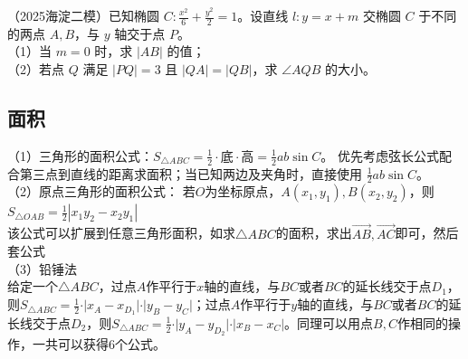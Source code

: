 \begin{example} 
（2025海淀二模）已知椭圆 $C:\frac{x^2}{6}+\frac{y^2}{2}=1$。设直线 $l:y=x+m$ 交椭圆 $C$ 于不同的两点 $A,B$，与 $y$ 轴交于点 $P$。\\
（1）当 $m=0$ 时，求 $\lvert AB\rvert$ 的值；\\
（2）若点 $Q$ 满足 $\lvert PQ\rvert=3$ 且 $\lvert QA\rvert=\lvert QB\rvert$，求 $\angle AQB$ 的大小。
\end{example}


\subsection{面积}
\noindent （1）三角形的面积公式：$S_{\triangle ABC}=\frac{1}{2}\cdot \text{底}\cdot \text{高}=\frac{1}{2}ab\sin C$。
优先考虑弦长公式配合第三点到直线的距离求面积；当已知两边及夹角时，直接使用 $\frac{1}{2}ab\sin C$。\\
（2）原点三角形的面积公式：
若$O$为坐标原点，$A(x_1,y_1),B(x_2,y_2)$，则
$S_{\triangle OAB}=\frac{1}{2}\left|x_1y_2-x_2y_1\right|$ \\
该公式可以扩展到任意三角形面积，如求$\triangle ABC$的面积，求出$\overrightarrow{AB},\overrightarrow{AC}$即可，然后套公式\\
（3）铅锤法 \\
给定一个$\triangle ABC$，过点$A$作平行于$x$轴的直线，与$BC$或者$BC$的延长线交于点$D_1$，则$S_{\triangle ABC} = \frac{1}{2} \cdot \vert x_A - x_{D_1} \vert \cdot \vert y_B - y_C \vert$；过点$A$作平行于$y$轴的直线，与$BC$或者$BC$的延长线交于点$D_2$，则$S_{\triangle ABC} = \frac{1}{2} \cdot \vert y_A - y_{D_2} \vert \cdot \vert x_B - x_C \vert$。同理可以用点$B,C$作相同的操作，一共可以获得6个公式。\\

